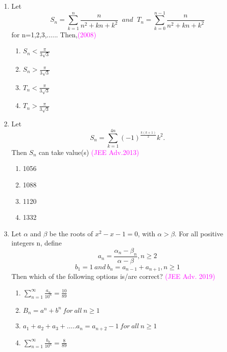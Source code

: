 \documentclass[journal,12pt,twocolumn]{IEEEtran}
\theoremstyle{remark}
\begin{document}
\begin{enumerate}
\item Let \begin{equation*}S_n=\sum_{k=1}^{n}\frac{n}{n^2+kn+k^2}\;\;and\;\; T_n=\sum_{k=0}^{n-1}\frac{n}{n^2+kn+k^2}\end{equation*}for\;\; n=1,2,3,...... Then,\hfill\textcolor{magenta}{(2008)}
\begin{multicols}{2}
\begin{enumerate}
\item $S_n<\frac{\pi}{3\sqrt{3}}$
\item $S_n>\frac{\pi}{3\sqrt{3}}$
\item $T_n<\frac{\pi}{3\sqrt{3}}$
\item $T_n>\frac{\pi}{3\sqrt{3}}$
\end{enumerate}
\end{multicols}

\item Let \begin{equation*} S_n=\sum_{k=1}^{4n}(-1)^\frac{k(k+1)}{2}k^2.\end{equation*}  Then $S_n$ can take value(s)  \hfill\textcolor{magenta}{(JEE Adv.2013)}
\begin{multicols}{2}
\begin{enumerate}
\item 1056
\item 1088
\item 1120
\item 1332
\end{enumerate}
\end{multicols}

\item Let $\alpha$ and $\beta$ be the roots of $x^2-x-1=0$, with $\alpha>\beta$. For all positive integers n, define
\begin{equation*}
a_n=\frac{\alpha_n-\beta_n}{\alpha-\beta},n\geq2
\end{equation*}
\begin{equation*}
b_1=1\:and\:b_n=a_{n-1}+a_{n+1},n\geq1
\end{equation*}
Then which of the following options is/are correct?
\hfill\textcolor{magenta}{(JEE Adv. 2019)}
\begin{enumerate}
\item $\sum_{n=1}^{\infty}\frac{a_n}{10^n}=\frac{10}{89}$
\item $B_n=a^n+b^n\:for\: all\: n\geq1$
\item $a_1+a_2+a_3+.....a_n=a_{n+2}-1\: for\: all\: n\geq1$
\item $\sum_{n=1}^{\infty}\frac{b_n}{10^n}=\frac{8}{89}$
\end{enumerate}
\end{enumerate}
\end{document}
